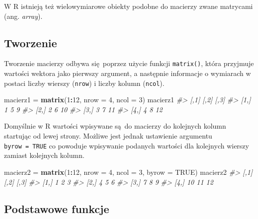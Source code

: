 \documentclass[paper=6in:9in,pagesize=pdftex,headinclude=on,footinclude=on,10pt]{scrbook}
\makeatletter
\newenvironment{Shaded}{\begin{snugshade}}{\end{snugshade}}
\newcommand{\CommentTok}[1]{\textcolor[rgb]{0.56,0.35,0.01}{\textit{#1}}}
\newcommand{\DataTypeTok}[1]{\textcolor[rgb]{0.13,0.29,0.53}{#1}}
\newcommand{\DecValTok}[1]{\textcolor[rgb]{0.00,0.00,0.81}{#1}}
\newcommand{\KeywordTok}[1]{\textcolor[rgb]{0.13,0.29,0.53}{\textbf{#1}}}
\newcommand{\NormalTok}[1]{#1}
\newcommand{\OperatorTok}[1]{\textcolor[rgb]{0.81,0.36,0.00}{\textbf{#1}}}
\newcommand{\OtherTok}[1]{\textcolor[rgb]{0.56,0.35,0.01}{#1}}
\newcommand{\StringTok}[1]{\textcolor[rgb]{0.31,0.60,0.02}{#1}}
\newenvironment{kframe}{%
\medskip{}
\setlength{\fboxsep}{.8em}
 \def\at@end@of@kframe{}%
 \ifinner\ifhmode%
  \def\at@end@of@kframe{\end{minipage}}%
  \begin{minipage}{\columnwidth}%
 \fi\fi%
 \def\FrameCommand##1{\hskip\@totalleftmargin \hskip-\fboxsep
 \colorbox{shadecolor}{##1}\hskip-\fboxsep
     \hskip-\linewidth \hskip-\@totalleftmargin \hskip\columnwidth}%
 \MakeFramed {\advance\hsize-\width
   \@totalleftmargin\z@ \linewidth\hsize
   \@setminipage}}%
 {\par\unskip\endMakeFramed%
 \at@end@of@kframe}
\newenvironment{rmdblock}[1]
  {
  \begin{itemize}
  \renewcommand{\labelitemi}{
    \raisebox{-.7\height}[0pt][0pt]{
      {\setkeys{Gin}{width=3em,keepaspectratio}\texttt{[image: images/\#1]}}
    }
  }
  \setlength{\fboxsep}{1em}
  \begin{kframe}
  \item
  }
  {
  \end{kframe}
  \end{itemize}
  }
\newenvironment{rmdinfo}
  {\begin{rmdblock}{compass}}
  {\end{rmdblock}}
\makeatother
\begin{document}
\begin{rmdinfo}
W R istnieją też wielowymiarowe obiekty podobne do macierzy zwane matrycami (ang. \emph{array}).
\end{rmdinfo}

\hypertarget{tworzenie}{%
\subsection{Tworzenie}\label{tworzenie}}

Tworzenie macierzy odbywa się~poprzez użycie funkcji \texttt{matrix()}, która przyjmuje wartości wektora jako pierwszy argument, a następnie informacje o wymiarach w postaci liczby wierszy (\texttt{nrow}) i liczby kolumn (\texttt{ncol}).

\begin{Shaded}
\begin{Highlighting}[]
\NormalTok{macierz1 =}\StringTok{ }\KeywordTok{matrix}\NormalTok{(}\DecValTok{1}\OperatorTok{:}\DecValTok{12}\NormalTok{, }\DataTypeTok{nrow =} \DecValTok{4}\NormalTok{, }\DataTypeTok{ncol =} \DecValTok{3}\NormalTok{)}
\NormalTok{macierz1}
\CommentTok{#>      [,1] [,2] [,3]}
\CommentTok{#> [1,]    1    5    9}
\CommentTok{#> [2,]    2    6   10}
\CommentTok{#> [3,]    3    7   11}
\CommentTok{#> [4,]    4    8   12}
\end{Highlighting}
\end{Shaded}

Domyślnie w R wartości wpisywane są~do macierzy do kolejnych kolumn startując od lewej strony.
Możliwe jest jednak ustawienie argumentu \texttt{byrow\ =\ TRUE} co powoduje wpisywanie podanych wartości dla kolejnych wierszy zamiast kolejnych kolumn.

\begin{Shaded}
\begin{Highlighting}[]
\NormalTok{macierz2 =}\StringTok{ }\KeywordTok{matrix}\NormalTok{(}\DecValTok{1}\OperatorTok{:}\DecValTok{12}\NormalTok{, }\DataTypeTok{nrow =} \DecValTok{4}\NormalTok{, }\DataTypeTok{ncol =} \DecValTok{3}\NormalTok{, }\DataTypeTok{byrow =} \OtherTok{TRUE}\NormalTok{)}
\NormalTok{macierz2}
\CommentTok{#>      [,1] [,2] [,3]}
\CommentTok{#> [1,]    1    2    3}
\CommentTok{#> [2,]    4    5    6}
\CommentTok{#> [3,]    7    8    9}
\CommentTok{#> [4,]   10   11   12}
\end{Highlighting}
\end{Shaded}

\hypertarget{podstawowe-funkcje}{%
\subsection{Podstawowe funkcje}\label{podstawowe-funkcje}}
\end{document}
